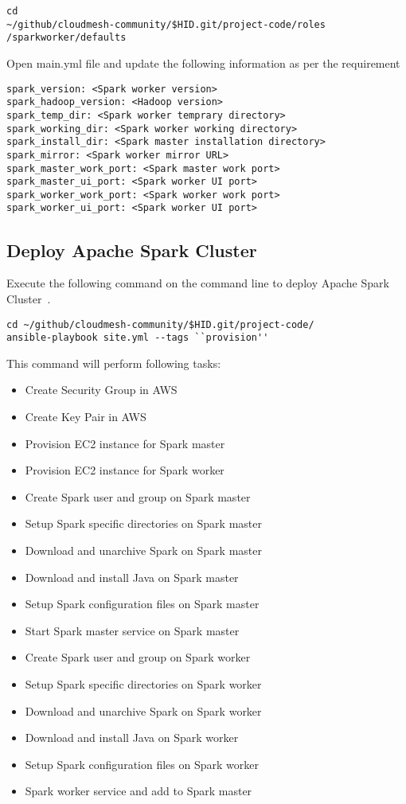 \begin{verbatim}
cd
~/github/cloudmesh-community/$HID.git/project-code/roles
/sparkworker/defaults
\end{verbatim}

Open main.yml file and update the following information as per the
requirement

\begin{verbatim}
spark_version: <Spark worker version>
spark_hadoop_version: <Hadoop version>
spark_temp_dir: <Spark worker temprary directory>
spark_working_dir: <Spark worker working directory>
spark_install_dir: <Spark master installation directory>
spark_mirror: <Spark worker mirror URL>
spark_master_work_port: <Spark master work port>
spark_master_ui_port: <Spark worker UI port>
spark_worker_work_port: <Spark worker work port>
spark_worker_ui_port: <Spark worker UI port>
\end{verbatim}

\subsection{Deploy Apache Spark Cluster}

Execute the following command on the command line to deploy Apache
Spark Cluster~\cite{hid-sp18-511-www-spark}.

\begin{verbatim}
cd ~/github/cloudmesh-community/$HID.git/project-code/
ansible-playbook site.yml --tags ``provision''
\end{verbatim}

This command will perform following tasks:

\begin{itemize}
	\item Create Security Group in AWS
	\item Create Key Pair in AWS
	\item Provision EC2 instance for Spark master
	\item Provision EC2 instance for Spark worker
	\item Create Spark user and group on Spark master
	\item Setup Spark specific directories on Spark master
	\item Download and unarchive Spark on Spark master
	\item Download and install Java on Spark master
	\item Setup Spark configuration files on Spark master
	\item Start Spark master service on Spark master
	\item Create Spark user and group on Spark worker
	\item Setup Spark specific directories on Spark worker
	\item Download and unarchive Spark  on Spark worker
	\item Download and install Java  on Spark worker
	\item Setup Spark configuration files on Spark worker
	\item Spark worker service and add to Spark master	
\end{itemize}

